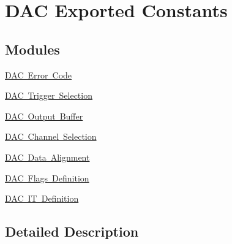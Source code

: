 \hypertarget{group___d_a_c___exported___constants}{}\section{D\+AC Exported Constants}
\label{group___d_a_c___exported___constants}
\subsection*{Modules}
\begin{DoxyCompactItemize}
\item 
\mbox{\hyperlink{group___d_a_c___error___code}{D\+A\+C Error Code}}
\item 
\mbox{\hyperlink{group___d_a_c__trigger__selection}{D\+A\+C Trigger Selection}}
\item 
\mbox{\hyperlink{group___d_a_c__output__buffer}{D\+A\+C Output Buffer}}
\item 
\mbox{\hyperlink{group___d_a_c___channel__selection}{D\+A\+C Channel Selection}}
\item 
\mbox{\hyperlink{group___d_a_c__data__alignment}{D\+A\+C Data Alignment}}
\item 
\mbox{\hyperlink{group___d_a_c__flags__definition}{D\+A\+C Flags Definition}}
\item 
\mbox{\hyperlink{group___d_a_c___i_t__definition}{D\+A\+C I\+T Definition}}
\end{DoxyCompactItemize}


\subsection{Detailed Description}
